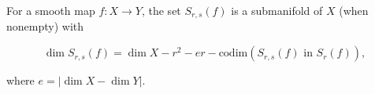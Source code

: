 For a smooth map $f: X \to Y$, the set $S_{r,s}(f)$ is a submanifold of $X$ (when nonempty) with

$$\dim S_{r,s}(f) = \dim X - r^2 - er - \text{codim}(S_{r,s}(f) \text{ in } S_r(f)),$$

where $e = |\dim X - \dim Y|$.
